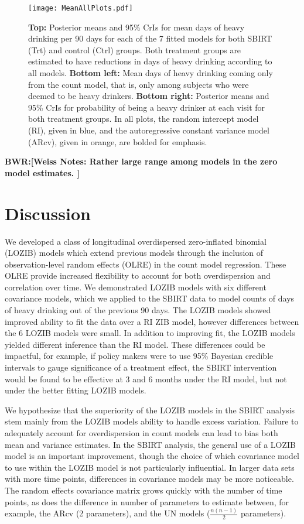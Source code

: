 \documentclass[12pt]{article}
\def\bwr#1{{\color{violet}\textbf{BWR:[#1]}}}
\begin{document}
\begin{figure}[t]
	\centering
	\texttt{[image: MeanAllPlots.pdf]}
	\caption{\textbf{Top:} Posterior means and 95\% CrIs for mean days of heavy drinking per 90 days for each of the 7 fitted models for both SBIRT (Trt) and control (Ctrl) groups. Both treatment groups are estimated to have reductions in days of heavy drinking according to all models. \textbf{Bottom left:} Mean days of heavy drinking coming only from the count model, that is, only among subjects who were deemed to be heavy drinkers. \textbf{Bottom right:} Posterior means and 95\% CrIs for probability of being a heavy drinker at each visit for both treatment groups. In all plots, the random intercept model (RI), given in blue, and the autoregressive constant variance model (ARcv), given in orange, are bolded for emphasis.}
	\label{fig:meanplots}
\end{figure}


\bwr{Weiss Notes: Rather large range among models in the zero model estimates. }

\section{Discussion}

We developed a class of longitudinal overdispersed zero-inflated binomial (LOZIB) models which extend previous models through the inclusion of observation-level random effects (OLRE) in the count model regression. These OLRE provide increased flexibility to account for both overdispersion and correlation over time. We demonstrated LOZIB models with six different covariance models, which we applied to the SBIRT data to model counts of days of heavy drinking out of the previous 90 days. The LOZIB models showed improved ability to fit the data over a RI ZIB model, however differences between the 6 LOZIB models were small. In addition to improving fit, the LOZIB models yielded different inference than the RI model. These differences could be impactful, for example, if policy makers were to use 95\% Bayesian credible intervals to gauge significance of a treatment effect, the SBIRT intervention would be found to be effective at 3 and 6 months under the RI model, but not under the better fitting LOZIB models. 

We hypothesize that the superiority of the LOZIB models in the SBIRT analysis stem mainly from the LOZIB models ability to handle excess variation. Failure to adequately account for overdispersion in count models can lead to bias both mean and variance estimates. In the SBIRT analysis, the general use of a LOZIB model is an important improvement, though the choice of which covariance model to use within the LOZIB model is not particularly influential. In larger data sets with more time points, differences in covariance models may be more noticeable. The random effects covariance matrix grows quickly with the number of time points, as does the difference in number of parameters to estimate between, for example, the ARcv (2 parameters), and the UN models ($\frac{n (n-1)}{2}$ parameters).  
\end{document}
